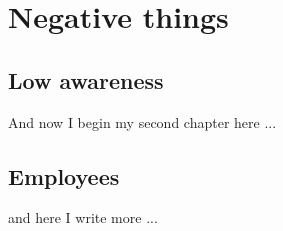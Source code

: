\chapter{Negative things}
\ifpdf
    \graphicspath{{Chapter2/Chapter2Figs/PNG/}{Chapter2/Chapter2Figs/PDF/}{Chapter2/Chapter2Figs/}}
\else
    \graphicspath{{Chapter2/Chapter2Figs/EPS/}{Chapter2/Chapter2Figs/}}
\fi

\section{Low awareness}
And now I begin my second chapter here ...

\section{Employees}
and here I write more ...






